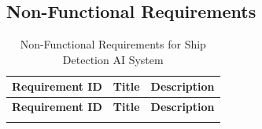 \documentclass{article}
\begin{document}
	\subsection{Non-Functional Requirements}
	\renewcommand{\arraystretch}{1.5}
	
	\begin{longtable}{>{\bfseries}p{4.5cm}p{3.5cm}p{6.5cm}}
		\caption{Non-Functional Requirements for Ship Detection AI System} \\
		\hline
		\textbf{Requirement ID} & \textbf{Title} & \textbf{Description} \\
		\hline
		\endfirsthead
		
		\hline
		\textbf{Requirement ID} & \textbf{Title} & \textbf{Description} \\
		\hline
		\endhead
		
		\hline
		\endfoot
		

\end{longtable}
\end{document}
